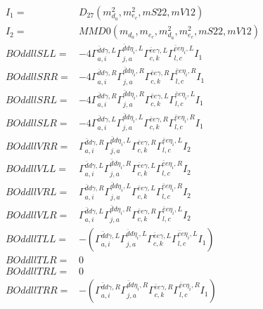 \documentclass[A4,landscape]{article}
\begin{document}
\begin{align} 
I_1 = & D_{27}(m^2_{d_{{a}}}, m^2_{e_{{c}}}, mS22, mV12) \\ 
I_2 = & MMD0(m_{d_{{a}}}, m_{e_{{c}}}, m^2_{d_{{a}}}, m^2_{e_{{c}}}, mS22, mV12) \\ 
  BOddllSLL= & -4  \Gamma^{\bar{d}d \gamma ,L}_{a, i} \Gamma^{\bar{d}d \eta_i ,L}_{j, a} \Gamma^{\bar{e}e \gamma ,L}_{c, k} \Gamma^{\bar{e}e \eta_i ,L}_{l, c} I_1 \\ 
  BOddllSRR= & -4  \Gamma^{\bar{d}d \gamma ,R}_{a, i} \Gamma^{\bar{d}d \eta_i ,R}_{j, a} \Gamma^{\bar{e}e \gamma ,R}_{c, k} \Gamma^{\bar{e}e \eta_i ,R}_{l, c} I_1 \\ 
  BOddllSRL= & -4  \Gamma^{\bar{d}d \gamma ,R}_{a, i} \Gamma^{\bar{d}d \eta_i ,R}_{j, a} \Gamma^{\bar{e}e \gamma ,L}_{c, k} \Gamma^{\bar{e}e \eta_i ,L}_{l, c} I_1 \\ 
  BOddllSLR= & -4  \Gamma^{\bar{d}d \gamma ,L}_{a, i} \Gamma^{\bar{d}d \eta_i ,L}_{j, a} \Gamma^{\bar{e}e \gamma ,R}_{c, k} \Gamma^{\bar{e}e \eta_i ,R}_{l, c} I_1 \\ 
  BOddllVRR= &  \Gamma^{\bar{d}d \gamma ,R}_{a, i} \Gamma^{\bar{d}d \eta_i ,L}_{j, a} \Gamma^{\bar{e}e \gamma ,R}_{c, k} \Gamma^{\bar{e}e \eta_i ,L}_{l, c} I_2 \\ 
  BOddllVLL= &  \Gamma^{\bar{d}d \gamma ,L}_{a, i} \Gamma^{\bar{d}d \eta_i ,R}_{j, a} \Gamma^{\bar{e}e \gamma ,L}_{c, k} \Gamma^{\bar{e}e \eta_i ,R}_{l, c} I_2 \\ 
  BOddllVRL= &  \Gamma^{\bar{d}d \gamma ,R}_{a, i} \Gamma^{\bar{d}d \eta_i ,L}_{j, a} \Gamma^{\bar{e}e \gamma ,L}_{c, k} \Gamma^{\bar{e}e \eta_i ,R}_{l, c} I_2 \\ 
  BOddllVLR= &  \Gamma^{\bar{d}d \gamma ,L}_{a, i} \Gamma^{\bar{d}d \eta_i ,R}_{j, a} \Gamma^{\bar{e}e \gamma ,R}_{c, k} \Gamma^{\bar{e}e \eta_i ,L}_{l, c} I_2 \\ 
  BOddllTLL= & -( \Gamma^{\bar{d}d \gamma ,L}_{a, i} \Gamma^{\bar{d}d \eta_i ,L}_{j, a} \Gamma^{\bar{e}e \gamma ,L}_{c, k} \Gamma^{\bar{e}e \eta_i ,L}_{l, c} I_1) \\ 
  BOddllTLR= & 0 \\ 
  BOddllTRL= & 0 \\ 
  BOddllTRR= & -( \Gamma^{\bar{d}d \gamma ,R}_{a, i} \Gamma^{\bar{d}d \eta_i ,R}_{j, a} \Gamma^{\bar{e}e \gamma ,R}_{c, k} \Gamma^{\bar{e}e \eta_i ,R}_{l, c} I_1) \\ 
\end{align} 
\end{document}
